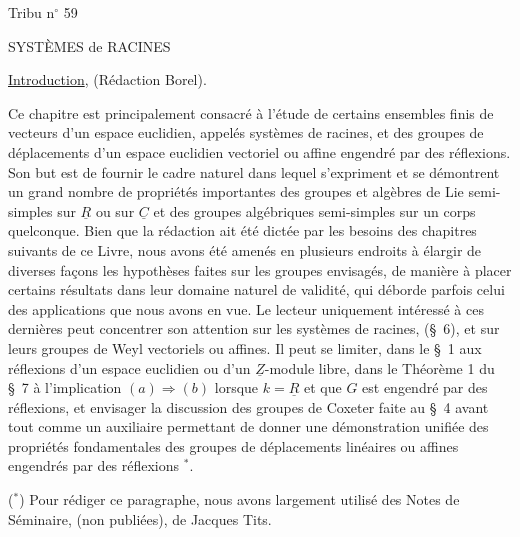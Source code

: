 \hfill Tribu n$^\circ$ 59

\begin{center}SYSTÈMES de RACINES\end{center}

\begin{center}\uline{Introduction}, (Rédaction Borel).\end{center}

Ce chapitre est principalement consacré à l'étude de certains ensembles finis de vecteurs d'un espace euclidien, appelés systèmes de racines, et des groupes de déplacements d'un espace euclidien vectoriel ou affine engendré par des réflexions.
Son but est de fournir le cadre naturel dans lequel s'expriment et se démontrent un grand nombre de propriétés importantes des groupes et algèbres de Lie semi-simples sur $\underline{R}$ ou sur $\underline{C}$ et des groupes algébriques semi-simples sur un corps quelconque.
Bien que la rédaction ait été dictée par les besoins des chapitres suivants de ce Livre, nous avons été amenés en plusieurs endroits à élargir de diverses façons les hypothèses faites sur les groupes envisagés, de manière à placer certains résultats dans leur domaine naturel de validité, qui déborde parfois celui des applications que nous avons en vue.
Le lecteur uniquement intéressé à ces dernières peut concentrer son attention sur les systèmes de racines, (\S\ 6), et sur leurs groupes de Weyl vectoriels ou affines.
Il peut se limiter, dans le \S\ 1 aux réflexions d'un espace euclidien ou d'un $\underline{Z}$-module libre, dans le Théorème 1 du \S\ 7 à l'implication $(a)\Longrightarrow(b)$ lorsque $k=\underline{R}$ et que $G$ est engendré par des réflexions, et envisager la discussion des groupes de Coxeter faite au \S\ 4 avant tout comme un auxiliaire permettant de donner une démonstration unifiée des propriétés fondamentales des groupes de déplacements linéaires ou affines engendrés par des réflexions $^*$.


($^*$) Pour rédiger ce paragraphe, nous avons largement utilisé des Notes de Séminaire, (non publiées), de Jacques Tits.

